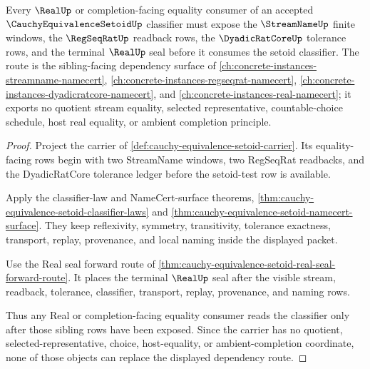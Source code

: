 \begin{theorem}
\label{thm:cauchy-equivalence-setoid-forward-dependency}
Every $\RealUp$ or completion-facing equality consumer of an accepted $\CauchyEquivalenceSetoidUp$ classifier must expose the $\StreamNameUp$ finite windows, the $\RegSeqRatUp$ readback rows, the $\DyadicRatCoreUp$ tolerance rows, and the terminal $\RealUp$ seal before it consumes the setoid classifier. The route is the sibling-facing dependency surface of \autoref{ch:concrete-instances-streamname-namecert}, \autoref{ch:concrete-instances-regseqrat-namecert}, \autoref{ch:concrete-instances-dyadicratcore-namecert}, and \autoref{ch:concrete-instances-real-namecert}; it exports no quotient stream equality, selected representative, countable-choice schedule, host real equality, or ambient completion principle.
\end{theorem}
\begin{proof}
Project the carrier of \autoref{def:cauchy-equivalence-setoid-carrier}. Its equality-facing rows begin with two StreamName windows, two RegSeqRat readbacks, and the DyadicRatCore tolerance ledger before the setoid-test row is available.

Apply the classifier-law and NameCert-surface theorems, \autoref{thm:cauchy-equivalence-setoid-classifier-laws} and \autoref{thm:cauchy-equivalence-setoid-namecert-surface}. They keep reflexivity, symmetry, transitivity, tolerance exactness, transport, replay, provenance, and local naming inside the displayed packet.

Use the Real seal forward route of \autoref{thm:cauchy-equivalence-setoid-real-seal-forward-route}. It places the terminal $\RealUp$ seal after the visible stream, readback, tolerance, classifier, transport, replay, provenance, and naming rows.

Thus any Real or completion-facing equality consumer reads the classifier only after those sibling rows have been exposed. Since the carrier has no quotient, selected-representative, choice, host-equality, or ambient-completion coordinate, none of those objects can replace the displayed dependency route.
\end{proof}
